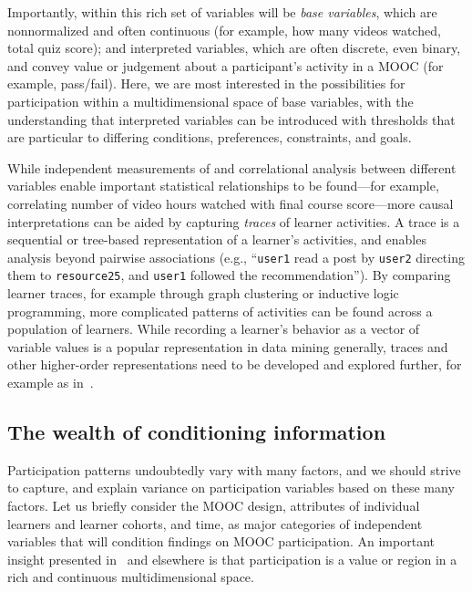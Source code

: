 Importantly, within this rich set of variables will be \emph{base variables},
which are nonnormalized and often continuous (for example, how many videos
watched, total quiz score); and interpreted variables, which are often
discrete, even binary, and convey value or judgement about a
participant's activity in a MOOC (for example, pass/fail). Here, we
are most interested in the possibilities for participation within a
multidimensional space of base variables, with the understanding that
interpreted variables can be introduced with thresholds that are
particular to differing conditions, preferences, constraints, and goals.

While independent measurements of and correlational analysis between
different variables 
enable important statistical relationships to be found---for example,
correlating number of video hours watched with final course score---more causal
interpretations can be aided by capturing \emph{traces} of learner
activities. A trace is a sequential or tree-based representation of a
learner's activities, and enables analysis beyond pairwise associations
(e.g., ``\texttt{user1} read a post by \texttt{user2} directing them to
\texttt{resource25},  and
\texttt{user1} followed the recommendation''). By comparing learner traces, for
example through graph clustering or inductive logic programming, more
complicated patterns of activities can be found across a population of
learners. While recording a learner's behavior as a vector of variable
values is a popular representation in data mining generally, traces and
other higher-order representations need to be developed and explored
further, for example as in~\cite{activity-tracing}.  

\subsection{The wealth of conditioning information}

Participation patterns
undoubtedly vary with many factors, and we should strive to capture, and
explain variance on participation variables based on these many
factors. Let us briefly consider the MOOC design, attributes
of individual learners and learner cohorts, and time, as major
categories of independent variables that will condition findings on MOOC
participation. An important insight presented in~\cite{mroe-2013-report}
and elsewhere is that participation is
a value or region in a rich and continuous multidimensional space.

